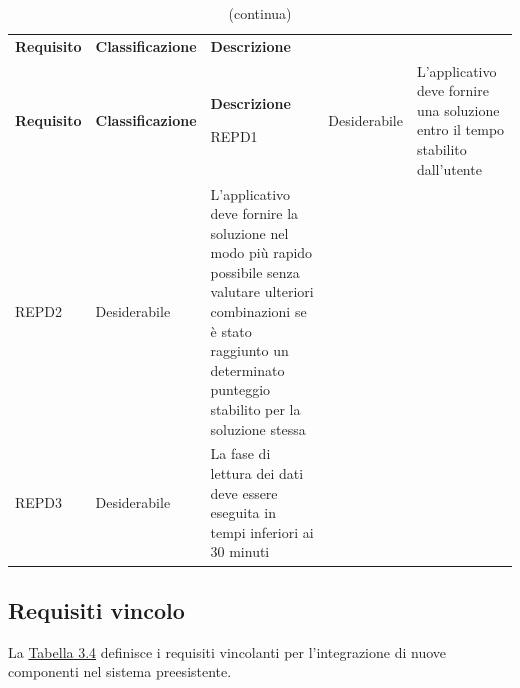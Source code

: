 \begin{longtable}{ >{\centering}p{} >{\centering}p{}
		>{\raggedright}p{} >{\centering}p{}}
	\caption{Tabella dei requisiti prestazionali}
	\label{3.3}
	\\
	\rowcolorhead 
	\textbf{\color{white}Requisito} 
	& \textbf{\color{white}Classificazione} 
	& \centering\textbf{\color{white}Descrizione}
	 
	\endfirsthead
	\caption[]{(continua)}\\
	\rowcolorhead 
	\textbf{\color{white}Requisito} 
	& \textbf{\color{white}Classificazione} 
	& \centering\textbf{\color{white}Descrizione}
	
	\endhead	
	
	REPD1	&	Desiderabile	&	L'applicativo deve fornire una soluzione entro il tempo stabilito dall'utente	 \tabularnewline
	REPD2	&	Desiderabile	&	L'applicativo deve fornire la soluzione nel modo più rapido possibile senza valutare ulteriori combinazioni se è stato
	raggiunto un determinato punteggio stabilito per la soluzione stessa \tabularnewline
	REPD3	&	Desiderabile	&	La fase di lettura dei dati deve essere eseguita in tempi inferiori ai 30 minuti \tabularnewline

\end{longtable}
\newpage
\subsection{Requisiti vincolo}

La \hyperref[3.4]{Tabella 3.4} definisce i requisiti vincolanti per l'integrazione di nuove componenti nel sistema preesistente.


